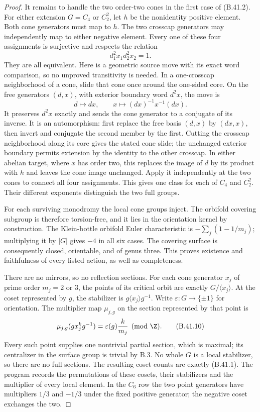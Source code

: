 \begin{proof}
It remains to handle the two order-two cones in the first case
of (B.41.2).  For either extension $G=C_4$ or $C_2^2$, let
$h$ be the nonidentity positive element.
Both cone generators must map to $h$.
The two crosscap generators may independently map to either
negative element.  Every one of these four assignments is
surjective and respects the relation
\[
                      d_1^2x_1d_2^2x_2=1.
                                                        \tag{B.41.8}
\]
They are all equivalent.  Here is a geometric source move with
its exact word comparison, so no unproved transitivity is needed.
In a one-crosscap neighborhood of a cone, slide that cone once
around the one-sided core.  On the free generators $(d,x)$,
with exterior boundary word $d^2x$, the move is
\[
        d\longmapsto dx,\qquad
        x\longmapsto (dx)^{-1}x^{-1}(dx).              \tag{B.41.9}
\]
It preserves $d^2x$ exactly and sends the cone generator to a
conjugate of its inverse.  It is an automorphism: first replace
the free basis $(d,x)$ by $(dx,x)$, then invert and conjugate
the second member by the first.  Cutting the crosscap
neighborhood along its core gives the stated cone slide;
the unchanged exterior boundary permits extension by the
identity to the other crosscap.
In either abelian target, where $x$ has order two, this
replaces the image of $d$ by its product with $h$ and leaves
the cone image unchanged.  Apply it independently at the two
cones to connect all four assignments.  This gives one class
for each of $C_4$ and $C_2^2$.  Their different exponents
distinguish the two full groups.

For each surviving monodromy the local cone groups inject.
The orbifold covering subgroup is therefore torsion-free,
and it lies in the orientation kernel by construction.
The Klein-bottle orbifold Euler characteristic is
$-\sum_j(1-1/m_j)$; multiplying it by $|G|$ gives $-4$ in
all six cases.  The covering surface is consequently closed,
orientable, and of genus three.  This proves existence and
faithfulness of every listed action, as well as completeness.

There are no mirrors, so no reflection sections.
For each cone generator $x_j$ of prime order $m_j=2$ or $3$,
the points of its critical orbit are exactly
$G/\langle x_j\rangle$.  At the coset represented by $g$,
the stabilizer is $g\langle x_j\rangle g^{-1}$.  Write
$\varepsilon:G\to\{\pm1\}$ for orientation.  The multiplier
map $\mu_{j,g}$ on the section represented by that point is
\[
      \mu_{j,g}(gx_j^kg^{-1})=
                  \varepsilon(g)\frac{k}{m_j}\pmod{\Z}.
                                                        \tag{B.41.10}
\]
Every such point supplies one nontrivial partial section,
which is maximal; its centralizer in the surface group is
trivial by B.3.  No whole $G$ is a local stabilizer, so there
are no full sections.  The resulting coset counts are
exactly (B.41.1).  The program records the permutations of
these cosets, their stabilizers and the multiplier of every
local element.  In the $C_6$ row the two point generators
have multipliers $1/3$ and $-1/3$ under the fixed positive
generator; the negative coset exchanges the two.


\end{proof}
